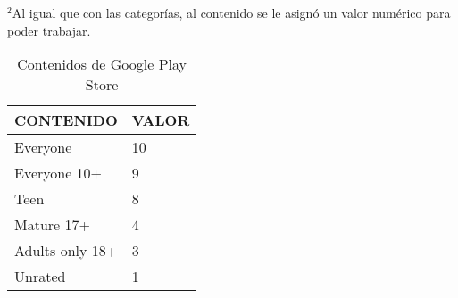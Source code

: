 \documentclass[10pt, a4paper]{article}
\begin{document}
$^{2}$Al igual que con las categor\'ias, al contenido se le asign\'o un valor num\'erico para poder trabajar.\\
\begin{table}[H]
\centering
\begin{tabular}{|l|l|}
\hline
CONTENIDO       & VALOR \\ \hline
Everyone        & 10    \\ \hline
Everyone 10+    & 9     \\ \hline
Teen            & 8     \\ \hline
Mature 17+      & 4     \\ \hline
Adults only 18+ & 3     \\ \hline
Unrated         & 1     \\ \hline
\end{tabular}
\caption{Contenidos de Google Play Store}
\label{Categorias}
\end{table} 
\end{document}
